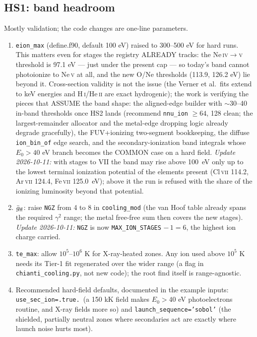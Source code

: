 \documentclass[english,a4paper]{my_memo}
\newcommand{\code}[1]{\texttt{#1}}
\newcommand{\HI}{H\,\textsc{i}}
\newcommand{\HeII}{He\,\textsc{ii}}
\begin{document}
\subsection{HS1: band headroom}

Mostly validation; the code changes are one-line parameters.

\begin{enumerate}[leftmargin=2em]
\item \code{eion\_max} (define.f90, default 100 eV) raised to
  300--500 eV for hard runs.  This matters even for stages the registry
  ALREADY tracks: the Ne\,\textsc{iv}$\to$\textsc{v} threshold is
  97.1 eV --- just under the present cap --- so today's band cannot
  photoionize to Ne\,\textsc{v} at all, and the new O/Ne thresholds
  (113.9, 126.2 eV) lie beyond it.  Cross-section validity is not the
  issue (the Verner et al.\ fits extend to keV energies and \HI/\HeII{}
  are exact hydrogenic); the work is verifying the pieces that ASSUME
  the band shape: the aligned-edge builder with $\sim$30--40 in-band
  thresholds once HS2 lands (recommend \code{nnu\_ion} $\geq 64$, 128
  clean; the largest-remainder allocator and the metal-edge dropping
  logic already degrade gracefully), the FUV+ionizing two-segment
  bookkeeping, the diffuse \code{ion\_bin\_of} edge search, and the
  secondary-ionization band integrals whose $E_0>40$ eV branch becomes
  the COMMON case on a hard field.  \emph{Update 2026-10-11:} with stages
  to VII the band may rise above 100~eV only up to the lowest terminal
  ionization potential of the elements present (Cl\,\textsc{vii} 114.2,
  Ar\,\textsc{vii} 124.4, Fe\,\textsc{vii} 125.0~eV); above it the run is
  refused with the share of the ionizing luminosity beyond that potential.
\item $\bar g_{\rm ff}$: raise \code{NGZ} from 4 to 8 in
  \code{cooling\_mod} (the van Hoof table already spans the required
  $\gamma^2$ range; the metal free-free sum then covers the new
  stages).  \emph{Update 2026-10-11:} \code{NGZ} is now
  \code{MAX\_ION\_STAGES} $-\,1 = 6$, the highest ion charge carried.
\item \code{te\_max}: allow $10^5$--$10^6$ K for X-ray-heated zones.
  Any ion used above $10^5$ K needs its Tier-1 fit regenerated over the
  wider range (a flag in \code{chianti\_cooling.py}, not new code); the
  root find itself is range-agnostic.
\item Recommended hard-field defaults, documented in the example
  inputs: \code{use\_sec\_ion=.true.}\ (a 150 kK field makes
  $E_0>40$ eV photoelectrons routine, and X-ray fields more so) and
  \code{launch\_sequence='sobol'} (the shielded, partially neutral
  zones where secondaries act are exactly where launch noise hurts
  most).
\end{enumerate}
\end{document}

